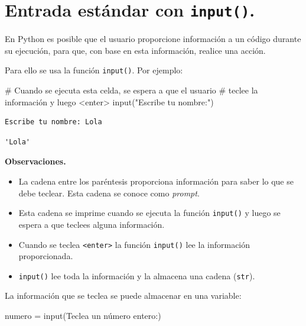 \documentclass[
  spanish,
  letterpaper,
]{scrbook}
\newenvironment{Shaded}{\begin{snugshade}}{\end{snugshade}}
\newcommand{\BuiltInTok}[1]{\textcolor[rgb]{0.00,0.23,0.31}{#1}}
\newcommand{\CommentTok}[1]{\textcolor[rgb]{0.37,0.37,0.37}{#1}}
\newcommand{\NormalTok}[1]{\textcolor[rgb]{0.00,0.23,0.31}{#1}}
\newcommand{\OperatorTok}[1]{\textcolor[rgb]{0.37,0.37,0.37}{#1}}
\newcommand{\StringTok}[1]{\textcolor[rgb]{0.13,0.47,0.30}{#1}}
\providecommand{\tightlist}{%
  \setlength{\itemsep}{0pt}\setlength{\parskip}{0pt}}
\theoremstyle{definition}
\theoremstyle{remark}
\begin{document}
\section{\texorpdfstring{Entrada estándar con
\texttt{input()}.}{Entrada estándar con input().}}\label{entrada-estuxe1ndar-con-input.}

En Python es posible que el usuario proporcione información a un código
durante su ejecución, para que, con base en esta información, realice
una acción.

Para ello se usa la función \texttt{input()}. Por ejemplo:

\begin{Shaded}
\begin{Highlighting}[]
\CommentTok{\# Cuando se ejecuta esta celda, se espera a que el usuario }
\CommentTok{\# teclee la información y luego \textless{}enter\textgreater{}}
\BuiltInTok{input}\NormalTok{(}\StringTok{"Escribe tu nombre:"}\NormalTok{) }
\end{Highlighting}
\end{Shaded}

\begin{verbatim}
Escribe tu nombre: Lola
\end{verbatim}

\begin{verbatim}
'Lola'
\end{verbatim}

\textbf{Observaciones.}

\begin{itemize}
\tightlist
\item
  La cadena entre los paréntesis proporciona información para saber lo
  que se debe teclear. Esta cadena se conoce como \emph{prompt}.
\item
  Esta cadena se imprime cuando se ejecuta la función \texttt{input()} y
  luego se espera a que teclees alguna información.
\item
  Cuando se teclea \texttt{\textless{}enter\textgreater{}} la función
  \texttt{input()} lee la información proporcionada.
\item
  \texttt{input()} lee toda la información y la almacena una cadena
  (\texttt{str}).
\end{itemize}

La información que se teclea se puede almacenar en una variable:

\begin{Shaded}
\begin{Highlighting}[]
\NormalTok{numero }\OperatorTok{=} \BuiltInTok{input}\NormalTok{(}\StringTok{\textquotesingle{}Teclea un número entero:\textquotesingle{}}\NormalTok{)}
\end{Highlighting}
\end{Shaded}
\end{document}
